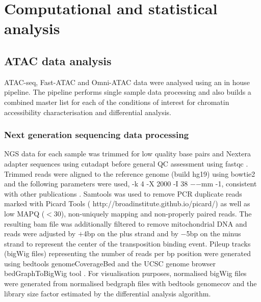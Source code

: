 \section{Computational and statistical analysis}

\subsection{ATAC data analysis}
\label{ATAC_analysis}
ATAC-seq, Fast-ATAC and Omni-ATAC data were analysed using an in house pipeline. The pipeline performs single sample data processing and also builds a combined master list for each of the conditions of interest for chromatin accessibility characterisation and differential analysis. 

\subsubsection{Next generation sequencing data processing}
NGS data for each sample was trimmed for low quality base pairs and Nextera adapter sequences using cutadapt \parencite{Martin2011} before general QC assessment using fastqc \parencite{Andrews2010}. Trimmed reads were aligned to the reference genome (build hg19) using bowtie2 \parencite{Langmead2012} and the following parameters were used, -k 4 -X 2000 -I 38 $-$$-$mm -1, consistent with other publications \parencite{Buenrostro2013, Corces2016}. Samtools \parencite{Li2009} was used to remove PCR duplicate reads marked with Picard Tools ( http://broadinstitute.github.io/picard/) as well as low MAPQ (${<}$30), non-uniquely mapping and non-properly paired reads. The resulting bam file was additionally filtered to remove mitochondrial DNA and reads were adjusted by $+$4bp on the plus strand and by $-$5bp on the minus strand to represent the center of the transposition binding event. Pileup tracks (bigWig files) representing the number of reads per bp position were generated using bedtools genomeCoverageBed \parencite{Quinlan2010} and the UCSC genome browser bedGraphToBigWig tool \parencite{Kent2010}. For visualisation purposes, normalised bigWig files were generated from normalised bedgraph files with bedtools genomecov and the library size factor estimated by the differential analysis algorithm. 

